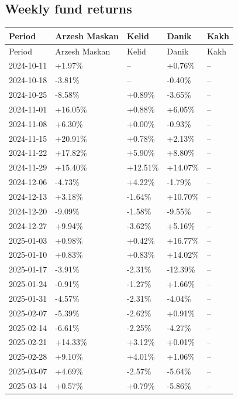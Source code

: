 \documentclass[11pt,a4paper]{article}
\begin{document}
\subsection{Weekly fund returns}

\begingroup\scriptsize\setlength{\tabcolsep}{3pt}
\begin{longtable}{lllll}
\toprule Period & Arzesh Maskan & Kelid & Danik & Kakh \\ \midrule\endfirsthead
\toprule Period & Arzesh Maskan & Kelid & Danik & Kakh \\ \midrule\endhead
2024-10-11 & +1.97\% & -- & +0.76\% & -- \\
2024-10-18 & -3.81\% & -- & -0.40\% & -- \\
2024-10-25 & -8.58\% & +0.89\% & -3.65\% & -- \\
2024-11-01 & +16.05\% & +0.88\% & +6.05\% & -- \\
2024-11-08 & +6.30\% & +0.00\% & -0.93\% & -- \\
2024-11-15 & +20.91\% & +0.78\% & +2.13\% & -- \\
2024-11-22 & +17.82\% & +5.90\% & +8.80\% & -- \\
2024-11-29 & +15.40\% & +12.51\% & +14.07\% & -- \\
2024-12-06 & -4.73\% & +4.22\% & -1.79\% & -- \\
2024-12-13 & +3.18\% & -1.64\% & +10.70\% & -- \\
2024-12-20 & -9.09\% & -1.58\% & -9.55\% & -- \\
2024-12-27 & +9.94\% & -3.62\% & +5.16\% & -- \\
2025-01-03 & +0.98\% & +0.42\% & +16.77\% & -- \\
2025-01-10 & +0.83\% & +0.83\% & +14.02\% & -- \\
2025-01-17 & -3.91\% & -2.31\% & -12.39\% & -- \\
2025-01-24 & -0.91\% & -1.27\% & +1.66\% & -- \\
2025-01-31 & -4.57\% & -2.31\% & -4.04\% & -- \\
2025-02-07 & -5.39\% & -2.62\% & +0.91\% & -- \\
2025-02-14 & -6.61\% & -2.25\% & -4.27\% & -- \\
2025-02-21 & +14.33\% & +3.12\% & +0.01\% & -- \\
2025-02-28 & +9.10\% & +4.01\% & +1.06\% & -- \\
2025-03-07 & +4.69\% & -2.57\% & -5.64\% & -- \\
2025-03-14 & +0.57\% & +0.79\% & -5.86\% & -- \\

\end{longtable}
\end{document}
